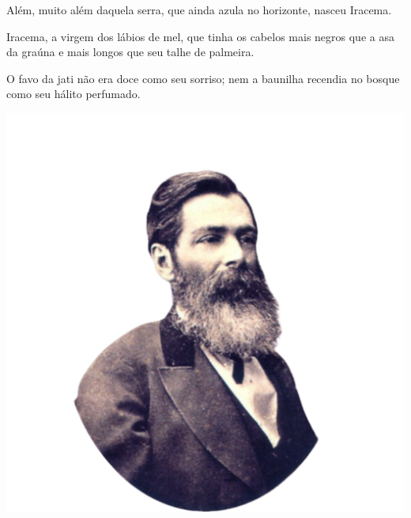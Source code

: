 \begin{myquote}


\begin{minipage}{0.6\textwidth}
Além, muito além daquela serra, que ainda azula no
horizonte, nasceu Iracema.

Iracema, a virgem dos lábios de mel, que tinha os
cabelos mais negros que a asa da graúna e mais longos
que seu talhe de palmeira.

O favo da jati não era doce como seu sorriso; nem
a baunilha recendia no bosque como seu hálito perfumado.
\end{minipage}
\hfill
\begin{minipage}{0.4\textwidth}
  \centering
  \includegraphics[width=\textwidth]{./imgSAEB_7_POR/media/image52.png}
\end{minipage}


\end{myquote}

